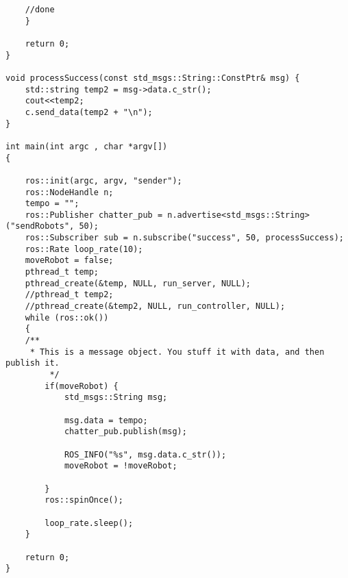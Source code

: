 \begin{lstlisting}
    //done
    } 
   
    return 0;
}

void processSuccess(const std_msgs::String::ConstPtr& msg) {
    std::string temp2 = msg->data.c_str();
    cout<<temp2;
    c.send_data(temp2 + "\n");
}
 
int main(int argc , char *argv[])
{

    ros::init(argc, argv, "sender");
    ros::NodeHandle n;
    tempo = "";
    ros::Publisher chatter_pub = n.advertise<std_msgs::String>("sendRobots", 50);
    ros::Subscriber sub = n.subscribe("success", 50, processSuccess);
    ros::Rate loop_rate(10);
    moveRobot = false;
    pthread_t temp;
    pthread_create(&temp, NULL, run_server, NULL);
    //pthread_t temp2;
    //pthread_create(&temp2, NULL, run_controller, NULL);
    while (ros::ok())
    {
    /**
     * This is a message object. You stuff it with data, and then publish it.
         */
        if(moveRobot) {
            std_msgs::String msg;
            
            msg.data = tempo;
            chatter_pub.publish(msg);

            ROS_INFO("%s", msg.data.c_str());
            moveRobot = !moveRobot;
            
        }
        ros::spinOnce();

        loop_rate.sleep();
    }

    return 0;
}
\end{lstlisting}
